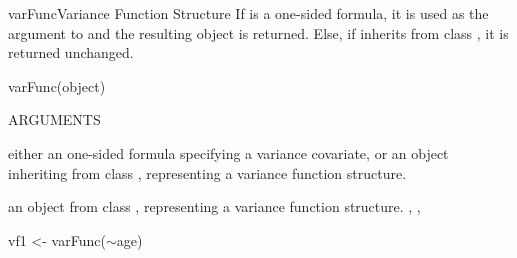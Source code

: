 \documentclass[pdftex]{article} \usepackage{url,graphicx}
\renewcommand{\Twiddle}{\mbox{\(\sim\)}}
\begin{document}
\begin{Helpfile}{varFunc}{Variance Function Structure}
If  is a one-sided formula, it is used as the argument to
 and the resulting object is returned. Else, if
 inherits from class , it is returned
unchanged.
\begin{Example}
varFunc(object)
\end{Example}
\begin{Argument}{ARGUMENTS}
\item[\Co{object:}]
either an one-sided formula specifying a variance
covariate, or an object inheriting from class ,
representing a variance function structure.
\end{Argument}
an object from class , representing a variance function
structure.
, ,
\need 15pt
\vspace{-16pt} 
\begin{Example}
vf1 <- varFunc(\Twiddle age)
\end{Example}
\end{Helpfile}
\end{document}

